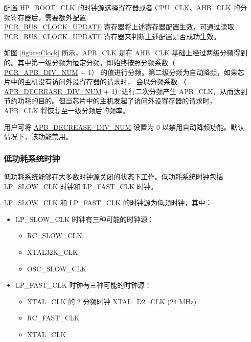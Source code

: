 \documentclass[main\_\_CN.tex]{subfiles}
\begin{document}
\begin{tiplisting}
配置 HP\_ROOT\_CLK 的时钟源选择寄存器或者 CPU\_CLK、AHB\_CLK 的分频寄存器后，需要额外配置 \\\hyperref[fielddesc:PCRBUSCLOCKUPDATE]{PCR\_BUS\_CLOCK\_UPDATE} 寄存器将上述寄存器配置生效，可通过读取 \hyperref[fielddesc:PCRBUSCLOCKUPDATE]{PCR\_BUS\_CLOCK\_UPDATE} 寄存器来判断上述配置是否成功生效。
\end{tiplisting}

如图 \ref{figure:Clock} 所示，APB\_CLK 是在 AHB\_CLK 基础上经过两级分频得到的。其中第一级分频为恒定分频，即始终按照分频系数（ \hyperref[fielddesc:PCRAPBDIVNUM]{PCR\_APB\_DIV\_NUM} + 1） 的值进行分频。第二级分频为自动降频，如果芯片中的主机没有访问外设寄存器的请求时， 会以分频系数 （ \hyperref[fielddesc:PCRAPBDECREASEDIVNUM]{APB\_DECREASE\_DIV\_NUM} + 1）进行二次分频产生 APB\_CLK，从而达到节约功耗的目的。但当芯片中的主机发起了访问外设寄存器的请求时，APB\_CLK 将恢复至一级分频后的频率。

用户可将 \hyperref[fielddesc:PCRAPBDECREASEDIVNUM]{APB\_DECREASE\_DIV\_NUM} 设置为 0 以禁用自动降频功能。默认情况下，该功能禁用。



\subsubsection{低功耗系统时钟}

低功耗系统能够在大多数时钟源关闭的状态下工作。低功耗系统时钟包括 LP\_SLOW\_CLK 时钟和 LP\_FAST\_CLK 时钟。

LP\_SLOW\_CLK 和 LP\_FAST\_CLK 的时钟源为低频时钟，其中：
\begin{itemize}
    \item LP\_SLOW\_CLK 时钟有三种可能的时钟源：
    \begin{itemize}
        \item RC\_SLOW\_CLK
        \item XTAL32K\_CLK
        \item OSC\_SLOW\_CLK
    \end{itemize}
    \item LP\_FAST\_CLK 时钟有三种可能的时钟源：
    \begin{itemize}
        \item XTAL\_CLK 的 2 分频时钟 XTAL\_D2\_CLK (24 MHz)
        \item RC\_FAST\_CLK
        \item XTAL\_CLK
    \end{itemize}
\end{itemize}
\end{document}
